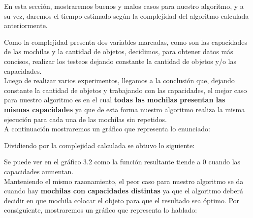 \indent En esta secci\'on, mostraremos buenos y malos casos para nuestro algoritmo, y a su vez, daremos el tiempo estimado 
seg\'un la complejidad del algoritmo calculada anteriormente.

Como la complejidad presenta dos variables marcadas, como son las capacidades de las mochilas y la cantidad de objetos, decidimos, para obtener datos m\'as concisos, realizar los testeos dejando constante la cantidad de objetos y/o las capacidades.\\

Luego de realizar varios experimentos, llegamos a la conclusi\'on que, dejando constante la cantidad de objetos y trabajando con las capacidades, el mejor caso para nuestro algoritmo es en el cual \textbf{todas las mochilas presentan las mismas capacidades} ya que de esta forma nuestro algoritmo realiza la misma ejecuci\'on para cada una de las mochilas sin repetidos.\\
A continuaci\'on mostraremos un gr\'afico que representa lo enunciado:

\vspace*{0.3cm} \vspace*{0.3cm}
  \begin{center}
  \end{center}
  \vspace*{0.3cm}

Dividiendo por la complejidad calculada se obtuvo lo siguiente:\\

\vspace*{0.3cm} \vspace*{0.3cm}
  \begin{center}
  \end{center}
  \vspace*{0.3cm}
  
Se puede ver en el gr\'afico 3.2 como la funci\'on resultante tiende a 0 cuando las capacidades aumentan.\\

Manteniendo el mismo razonamiento, el peor caso para nuestro algoritmo se da cuando hay \textbf{mochilas con capacidades distintas} ya que el algoritmo deber\'a decidir en que mochila colocar el objeto para que el resultado sea \'optimo. Por consiguiente, mostraremos un gr\'afico que representa lo hablado:\\

\vspace*{0.3cm} \vspace*{0.3cm}
  \begin{center}
  \end{center}
  \vspace*{0.3cm}

